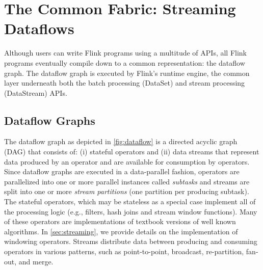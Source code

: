 \documentclass[11pt]{article}
\begin{document}
\section{The Common Fabric: Streaming Dataflows}
\label{sec:execution}
\vspace{-3mm}

Although users can write Flink programs using a multitude of APIs, all Flink programs eventually compile down to a common representation: the dataflow graph. The dataflow graph is executed by Flink's runtime engine, the common layer underneath both the batch processing (DataSet) and stream processing (DataStream) APIs.

\vspace{-2mm}
\subsection{Dataflow Graphs}
\vspace{-2mm}
The dataflow graph as depicted in \autoref{fig:dataflow} is a directed acyclic graph (DAG) that consists of: (i) stateful operators  and (ii) data streams that represent data produced by an operator and are available for consumption by operators. Since dataflow graphs are executed in a data-parallel fashion, operators are parallelized into one or more parallel instances called \emph{subtasks} and streams are split into one or more \emph{stream partitions} (one partition per producing subtask). 
The stateful operators, which may be stateless as a special case implement all of the processing logic  (e.g., filters, hash joins and stream window functions). Many of these operators are implementations of textbook versions of well known algorithms. In \autoref{sec:streaming}, we provide details on the implementation of windowing operators. Streams distribute data between producing and consuming operators in various patterns, such as point-to-point, broadcast, re-partition, fan-out, and merge.
\end{document}
